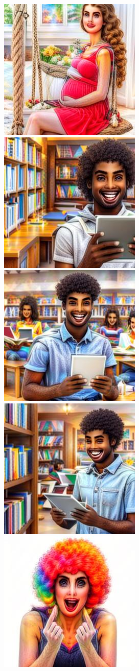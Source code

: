 \begin{figure}[h!]
\begin{subfigure}[t]{0.32\linewidth}
    	\includegraphics[width=0.32\linewidth]{figs/samples_appendix_4/draft1k_cfg_2_ode_prompt_16_image_2.jpg}\\ 
    	\includegraphics[width=0.32\linewidth]{figs/samples_appendix_4/draft1k_cfg_2_ode_prompt_17_image_0.jpg}\;%
    	\includegraphics[width=0.32\linewidth]{figs/samples_appendix_4/draft1k_cfg_2_ode_prompt_17_image_1.jpg}\;%
    	\includegraphics[width=0.32\linewidth]{figs/samples_appendix_4/draft1k_cfg_2_ode_prompt_17_image_2.jpg}\\ 
    	\includegraphics[width=0.32\linewidth]{figs/samples_appendix_4/draft1k_cfg_2_ode_prompt_21_image_0.jpg}\;%

\end{subfigure}
\end{figure}
